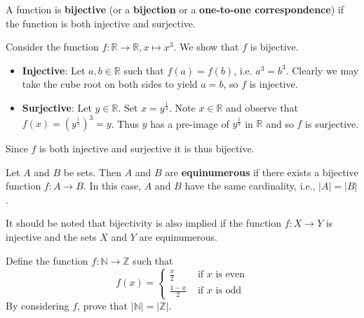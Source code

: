 \begin{definition}
    A function is \textbf{bijective} (or a \textbf{bijection} or a \textbf{one-to-one correspondence}) if the function is both injective and surjective.
\end{definition}
\begin{example}
    Consider the function $f: \mathbb{R} \to \mathbb{R}, x \mapsto x^3$. We show that $f$ is bijective.
    \begin{itemize}
        \item \textbf{Injective}: Let $a, b \in \mathbb{R}$ such that $f(a) = f(b)$, i.e. $a^3 = b^3$. Clearly we may take the cube root on both sides to yield $a = b$, so $f$ is injective.
        \item \textbf{Surjective}: Let $y \in \mathbb{R}$. Set $x=y^{\frac13}$. Note $x \in \mathbb{R}$ and observe that $f(x) = \left(y^{\frac13}\right)^3 = y$. Thus $y$ has a pre-image of $y^{\frac13}$ in $\mathbb{R}$ and so $f$ is surjective.
    \end{itemize}
    Since $f$ is both injective and surjective it is thus bijective.
\end{example}

\newpage

\begin{definition}
    Let $A$ and $B$ be sets. Then $A$ and $B$ are \textbf{equinumerous} if there exists a bijective function $f: A \to B$. In this case, $A$ and $B$ have the same cardinality, i.e., $|A| = |B|$.
\end{definition}
\begin{remark}
    It should be noted that bijectivity is also implied if the function $f: X \to Y$ is injective and the sets $X$ and $Y$ are equinumerous.
\end{remark}

\begin{exercise}
    Define the function $f: \mathbb{N} \to \mathbb{Z}$ such that
    \[
        f(x) = \begin{cases}
            \frac{x}{2} & \text{ if } x \text{ is even}\\
            \frac{1-x}{2} & \text{ if } x \text{ is odd} 
        \end{cases}
    \]
    By considering $f$, prove that $|\mathbb{N}| = |\mathbb{Z}|$.
\end{exercise}
